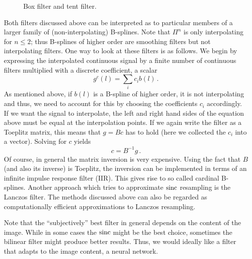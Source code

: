 \begin{figure}[htpb]
\centering
{}
\caption{Box filter and tent filter.}%
\label{fig:filters}
\end{figure}

Both filters discussed above can be interpreted as to particular members of a
larger family of (non-interpolating) B-splines. Note that $\Pi^n$ is only
interpolating for $n \le 2$; thus B-splines of higher order are smoothing
filters but not interpolating filters. One way to look at these filters is as
follows. We begin by expressing the interpolated continuous signal by a finite
number of continuous filters multiplied with a discrete coefficient, \ie a
scalar
\begin{equation*}
  g^c(l) = \sum_i c_i b(l)\,.
\end{equation*}
As mentioned above, if $b(l)$ is a B-spline of higher order, it is not
interpolating and thus, we need to account for this by choosing the coefficients
$c_i$ accordingly. If we want the signal to interpolate, the left and right hand
sides of the equation above must be equal at the interpolation points. If we
again write the filter as a Toeplitz matrix, this means that $g = Bc$ has to
hold (here we collected the $c_i$ into a vector). Solving for $c$ yields
\begin{equation*}
  c = B^{-1}g\,.
\end{equation*}
Of course, in general the matrix inversion is very expensive. Using the fact
that $B$ (and also its inverse) is Toeplitz, the inversion can be implemented in
terms of an infinite impulse response filter (IIR). This gives rise to so called
cardinal B-splines. Another approach which tries to approximate $\operatorname{sinc}$
resampling is the Lanczos filter. The methods discussed above can also be
regarded as computationally efficient approximations to Lanczos resampling.

Note that the ``subjectively'' best filter in general depends on the content of
the image. While in some cases the $\operatorname{sinc}$ might be the best choice, sometimes
the bilinear filter might produce better results. Thus, we would ideally like a
filter that adapts to the image content, \eg a neural network.

